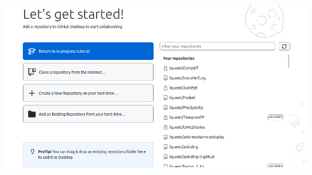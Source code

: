 \documentclass[compress,aspectratio=169]{beamer}
\begin{document}
  \begin{frame}
    \begin{center}
      \includegraphics[height=0.85\textheight]{./assets/GHOverview.png}
    \end{center}
  \end{frame}
\end{document}
